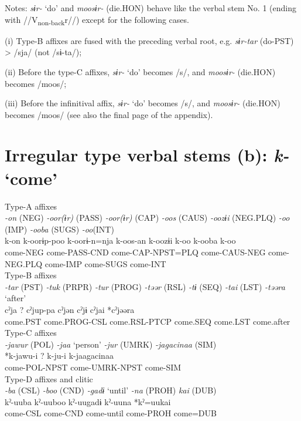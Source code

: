 Notes: \textit{sɨr-} ‘do’ and \textit{moosɨr-} (die.HON) behave like the verbal stem No. 1 (ending with //V\textsubscript{non-back}r//) except for the following cases.

(i)  Type-B affixes are fused with the preceding verbal root, e.g. \textit{sɨr-tar} (do-PST) > /sja/ (not /sɨ-ta/);

(ii)  Before the type-C affixes, \textit{sɨr-} ‘do’ becomes /s/, and \textit{moosɨr-} (die.HON) becomes /moos/;

(iii)  Before the infinitival affix, \textit{sɨr-} ‘do’ becomes /s/, and \textit{moosɨr-} (die.HON) becomes /moos/ (see also the final page of the appendix).

\section{Irregular type verbal stems (b): \textit{k-} ‘come’}

\ea Type-A affixes\\
\glll \textit{-on} (NEG)  \textit{-oor(ɨr)} (PASS)  \textit{-oor(ɨr)} (CAP)  \textit{-oos} (CAUS)  \textit{-oozɨi} (NEG.PLQ)  \textit{-oo} (IMP)  \textit{-ooba} (SUGS)  \textit{-oo}(INT)\\
k-on  k-oorɨp-poo  k-oorɨ-n=nja  k-oos-an  k-oozɨi  k-oo  k-ooba  k-oo\\
come-NEG  come-PASS-CND  come-CAP-NPST=PLQ  come-CAUS-NEG  come-NEG.PLQ  come-IMP  come-SUGS  come-INT\\


\ex Type-B affixes\\
\glll \textit{-tar} (PST)  \textit{-tuk} (PRPR)  \textit{-tur} (PROG)  \textit{-təər} (RSL)  \textit{-tɨ} (SEQ)  \textit{-tai} (LST)  \textit{-təəra} ‘after’\\
cˀja  ?  cˀjup-pa  cˀjən  cˀjɨ  cˀjai  *cˀjəəra\\
come.PST    come.PROG-CSL  come.RSL-PTCP  come.SEQ  come.LST  come.after\\


\ex Type-C affixes\\
\glll \textit{-jawur} (POL)  \textit{-jaa} ‘person’  \textit{-jur} (UMRK)  \textit{-jagacinaa} (SIM)\\
*k-jawu-i  ?  k-ju-i  k-jaagacinaa\\
come-POL-NPST    come-UMRK-NPST  come-SIM\\


\ex Type-D affixes and clitic\\
\glll \textit{-ba} (CSL)  \textit{-boo} (CND)  \textit{-gadɨ} ‘until’  \textit{-na} (PROH)  \textit{kai} (DUB)\\
kˀ-uuba  kˀ-uuboo  kˀ-uugadɨ  kˀ-uuna  *kˀ=uukai\\
come-CSL  come-CND  come-until  come-PROH  come=DUB\\
\z

